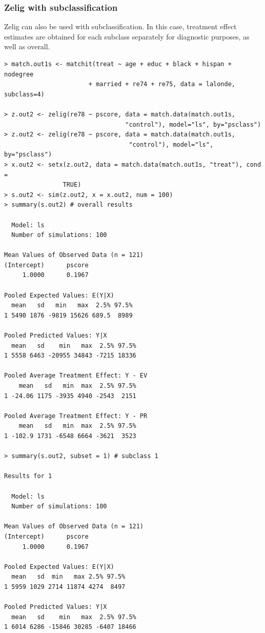\documentclass[oneside,letterpaper,titlepage]{article}
\begin{document}
\subsubsection{Zelig with subclassification}

Zelig can also be used with subclassification.  In this case,
treatment effect estimates are obtained for each subclass separately
for diagnostic purposes, as well as overall.

\begin{verbatim}
> match.out1s <- matchit(treat ~ age + educ + black + hispan + nodegree
                       + married + re74 + re75, data = lalonde, subclass=4)

> z.out2 <- zelig(re78 ~ pscore, data = match.data(match.out1s,
                                 "control"), model="ls", by="psclass")
> z.out2 <- zelig(re78 ~ pscore, data = match.data(match.out1s,
                                  "control"), model="ls", by="psclass")
> x.out2 <- setx(z.out2, data = match.data(match.out1s, "treat"), cond =
                TRUE)
> s.out2 <- sim(z.out2, x = x.out2, num = 100)
> summary(s.out2) # overall results

  Model: ls 
  Number of simulations: 100 

Mean Values of Observed Data (n = 121) 
(Intercept)      pscore 
     1.0000      0.1967 

Pooled Expected Values: E(Y|X)
  mean   sd   min   max  2.5% 97.5%
1 5490 1876 -9819 15626 689.5  8989

Pooled Predicted Values: Y|X
  mean   sd    min   max  2.5% 97.5%
1 5558 6463 -20955 34843 -7215 18336

Pooled Average Treatment Effect: Y - EV
    mean   sd   min  max  2.5% 97.5%
1 -24.06 1175 -3935 4940 -2543  2151

Pooled Average Treatment Effect: Y - PR
    mean   sd   min  max  2.5% 97.5%
1 -102.9 1731 -6548 6664 -3621  3523

> summary(s.out2, subset = 1) # subclass 1

Results for 1 

  Model: ls 
  Number of simulations: 100 

Mean Values of Observed Data (n = 121) 
(Intercept)      pscore 
     1.0000      0.1967 

Pooled Expected Values: E(Y|X)
  mean   sd  min   max 2.5% 97.5%
1 5959 1029 2714 11874 4274  8497

Pooled Predicted Values: Y|X
  mean   sd    min   max  2.5% 97.5%
1 6014 6286 -15846 30285 -6407 18466


\end{verbatim}
\end{document}
